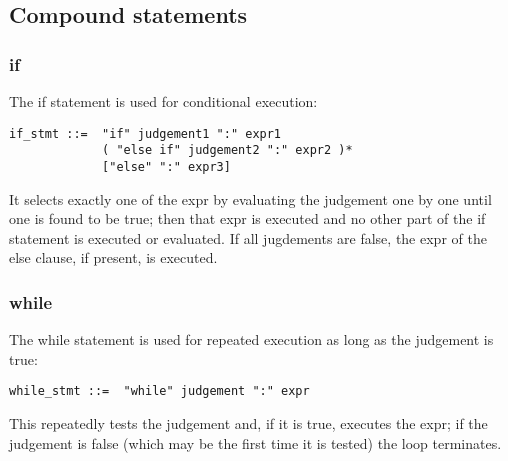 \documentclass[12pt]{article}
\begin{document}
\subsection{Compound statements}
\subsubsection{if} %
The if statement is used for conditional execution:
\begin{lstlisting}[caption=if]
if_stmt ::=  "if" judgement1 ":" expr1
             ( "else if" judgement2 ":" expr2 )*
             ["else" ":" expr3]
\end{lstlisting}
It selects exactly one of the expr by evaluating the judgement one by one until one is found to be true; then that expr is executed and no other part of the if statement is executed or evaluated. If all jugdements are false, the expr of the else clause, if present, is executed.

\subsubsection{while} %
The while statement is used for repeated execution as long as the judgement is true:
\begin{lstlisting}[caption=while]
while_stmt ::=  "while" judgement ":" expr
\end{lstlisting}
This repeatedly tests the judgement and, if it is true, executes the expr; if the judgement is false (which may be the first time it is tested) the loop terminates.\\
\end{document}
